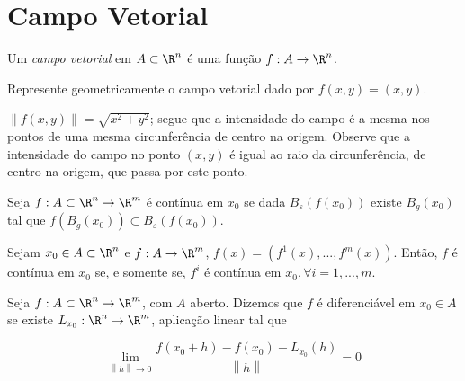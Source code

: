\documentclass{book}
\begin{document}
\section{Campo Vetorial} \label{sec24}

\begin{defn}
Um \textit{campo vetorial} em $A \subset \R^n$ \'e uma fun\c c\~ao $f:A \to \R^n$.
\end{defn}


\begin{ex}
Represente geometricamente o campo vetorial dado por $f(x,y)=(x,y)$.
\end{ex}

\begin{sol}
$\left\| {f\left( {x,y} \right)} \right\| = \sqrt {x^2  + y^2 }$; segue que a intensidade do campo \'e a mesma nos pontos de uma mesma circunfer\^encia de centro na origem. Observe que a intensidade do campo no ponto $(x,y)$ \'e igual ao raio da circunfer\^encia, de centro na origem, que passa por este ponto.

\end{sol}

\begin{defn}
Seja $f:A \subset \R^n  \to \R^m$ \'e cont\'inua em $x_0$ se dada $B_\varepsilon  \left( {f\left( {x_0 } \right)} \right)$ existe $B_g \left( {x_0 } \right)$ tal que $f\left( {B_g \left( {x_0 } \right)} \right) \subset B_\varepsilon  \left( {f\left( {x_0 } \right)} \right)$.
\end{defn}

\begin{teo}
Sejam $x_0 \in A \subset \R^n$ e $f:A \to \R^m$, $f\left( x \right) = \left( {f^1 \left( x \right),...,f^m \left( x \right)} \right)$. Ent\~ao, $f$ \'e cont\'inua em $x_0$ se, e somente se, $f^i$ \'e cont\'inua em $x_0, \forall i = 1,...,m$.
\end{teo}

\begin{defn}
Seja $f:A \subset \R^n  \to \R^m$, com $A$ aberto. Dizemos que $f$ \'e diferenci\'avel em $x_0 \in A$ se existe $L_{x_0 } :\R^n  \to \R^m$, aplica\c c\~ao linear tal que

\[
\mathop {\lim }\limits_{\left\| h \right\| \to 0} \frac{{f\left( {x_0  + h} \right) - f\left( {x_0 } \right) - L_{x_0 } \left( h \right)}}
{{\left\| h \right\|}} = 0
\]

\end{defn}
\end{document}
